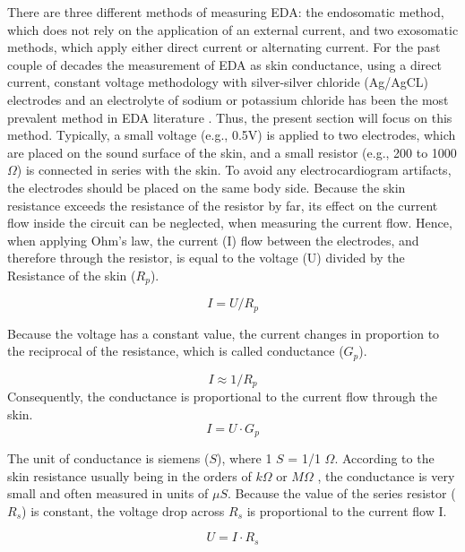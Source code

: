 There are three different methods of measuring EDA: the endosomatic method, which does not rely on the application of an external current, and two exosomatic methods, which apply either direct current or alternating current. For the past couple of decades the measurement of EDA as skin conductance, using a direct current, constant voltage methodology with silver-silver chloride (Ag/AgCL) electrodes and an electrolyte of sodium or potassium chloride has been the most prevalent method in EDA literature \citep{boucsein2012electrodermal}. Thus, the present section will focus on this method. Typically, a small voltage (e.g., 0.5V) is applied to two electrodes, which are placed on the sound surface of the skin, and a small resistor (e.g., 200 to 1000 $\Omega$) is connected in series with the skin.  To avoid any electrocardiogram artifacts, the electrodes should be placed on the same body side. Because the skin resistance exceeds the resistance of the resistor by far, its   effect on the current flow inside the circuit can be neglected, when measuring the current flow. Hence, when applying Ohm's law, the current (I) flow between the electrodes, and therefore through the resistor, is equal to the voltage (U) divided by the Resistance of the skin ($R_{p}$).

\begin{equation} \label{OhmsLaw}
I = U / R_{p}
\end{equation}

Because the voltage has a constant value, the current changes in proportion to the reciprocal of the resistance, which is called conductance ($G_{p}$).  

\begin{equation}
I \approx 1/R_{p} 
\end{equation}
Consequently, the conductance is proportional to the current flow through the skin.
\begin{equation} \label{IG}
I = U \cdot G_{p}
\end{equation}

The unit of conductance is siemens ($S$), where 1 $S$ = 1/1 $\Omega$. According to the skin resistance usually being in the orders of $k\Omega$ or $M\Omega$ , the conductance is very small and often measured in units of $\mu S$. Because the value of the series resistor ($R_{s}$) is constant, the voltage drop across $R_{s}$ is proportional to the current flow I. 

\begin{equation}
U = I \cdot R_{s}
\end{equation}

